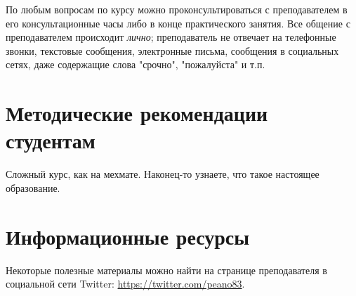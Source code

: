 \documentclass{article}
\begin{document}
По любым вопросам по курсу можно проконсультироваться с преподавателем в его консультационные часы либо в конце практического занятия. Все общение с преподавателем происходит {\em лично}; преподаватель не отвечает на телефонные звонки, текстовые сообщения, электронные письма, сообщения в социальных сетях, даже содержащие слова "срочно", "пожалуйста" и т.п.

\section{Методические рекомендации студентам}
Сложный курс, как на мехмате. Наконец-то узнаете, что такое настоящее образование.


\section{Информационные ресурсы}

Некоторые полезные материалы можно найти на странице преподавателя в социальной сети Twitter:
\url{https://twitter.com/peano83}.
\end{document}
